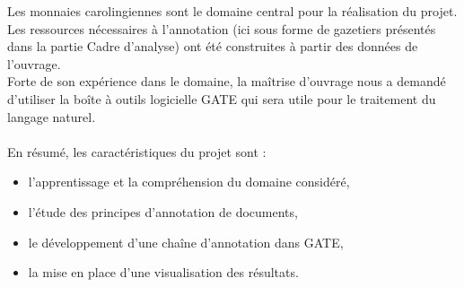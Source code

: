 \documentclass[a4paper, 11pt]{report}
\begin{document}
Les monnaies carolingiennes sont le domaine central pour la réalisation du projet. Les ressources nécessaires à l'annotation (ici sous forme de gazetiers présentés dans la partie Cadre d'analyse) ont été construites à partir des données de l'ouvrage.\\

Forte de son expérience dans le domaine, la maîtrise d'ouvrage nous a demandé d'utiliser la boîte à outils logicielle GATE qui sera utile pour le traitement du langage naturel.\\~\\

En résumé, les caractéristiques du projet sont : 
\begin{itemize}
\item l'apprentissage et la compréhension du domaine considéré,
\item l'étude des principes d'annotation de documents,
\item le développement d'une chaîne d'annotation dans GATE,
\item la mise en place d'une visualisation des résultats.
\end{itemize}

\newpage
\end{document}
